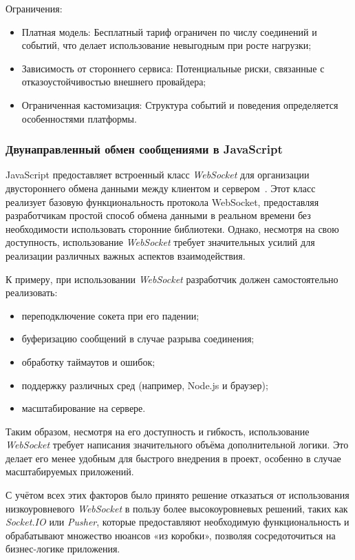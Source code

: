 Ограничения:
\begin{itemize}
  \item Платная модель: Бесплатный тариф ограничен по числу соединений и событий, что делает использование невыгодным при росте нагрузки;
  \item Зависимость от стороннего сервиса: Потенциальные риски, связанные с отказоустойчивостью внешнего провайдера;
  \item Ограниченная кастомизация: Структура событий и поведения определяется особенностями платформы.
\end{itemize}

\subsubsection*{Двунаправленный обмен сообщениями в JavaScript}

JavaScript предоставляет встроенный класс \textit{WebSocket} для организации двустороннего обмена данными между клиентом и сервером~\cite{mdn_websocket_api}. Этот класс реализует базовую функциональность протокола WebSocket, предоставляя разработчикам простой способ обмена данными в реальном времени без необходимости использовать сторонние библиотеки. Однако, несмотря на свою доступность, использование \textit{WebSocket} требует значительных усилий для реализации различных важных аспектов взаимодействия.

К примеру, при использовании \textit{WebSocket} разработчик должен самостоятельно реализовать:
\begin{itemize}
  \item переподключение сокета при его падении;
  \item буферизацию сообщений в случае разрыва соединения;
  \item обработку таймаутов и ошибок;
  \item поддержку различных сред (например, Node.js и браузер);
  \item масштабирование на сервере.
\end{itemize}

Таким образом, несмотря на его доступность и гибкость, использование \textit{WebSocket} требует написания значительного объёма дополнительной логики. Это делает его менее удобным для быстрого внедрения в проект, особенно в случае масштабируемых приложений.

С учётом всех этих факторов было принято решение отказаться от использования низкоуровневого \textit{WebSocket} в пользу более высокоуровневых решений, таких как \textit{Socket.IO} или \textit{Pusher}, которые предоставляют необходимую функциональность и обрабатывают множество нюансов «из коробки», позволяя сосредоточиться на бизнес-логике приложения.


